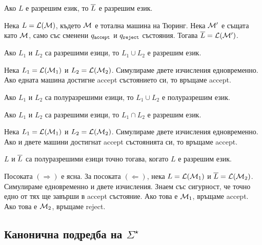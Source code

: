\begin{prop}
  Ако $L$ е разрешим език, то $\overline{L}$ е разрешим език.
\end{prop}
\begin{hint}
  Нека $L = \mathcal{L}(\mathcal{M})$, където $\mathcal{M}$ е тотална машина на Тюринг.
  Нека $\mathcal{M}'$ е същата като $\mathcal{M}$, само със сменени $q_{\texttt{accept}}$ и $q_{\texttt{reject}}$ състояния.
  Тогава $\overline{L} = \mathcal{L}(\mathcal{M}')$.
\end{hint}

\begin{prop}
  Ако $L_1$ и $L_2$ са разрешими езици, то $L_1 \cup L_2$ е разрешим език.
\end{prop}
\begin{hint}
  Нека $L_1 = \mathcal{L}(\mathcal{M}_1)$ и $L_2 = \mathcal{L}(\mathcal{M}_2)$.
  Симулираме двете изчисления едновременно.
  Ако едната машина достигне accept състоянието си, то връщаме accept.
\end{hint}

\begin{prop}
  Ако $L_1$ и $L_2$ са полуразрешими езици, то $L_1 \cup L_2$ е полуразрешим език.
\end{prop}

\begin{prop}
  Ако $L_1$ и $L_2$ са разрешими езици, то $L_1 \cap L_2$ е разрешим език.
\end{prop}
\begin{hint}
  Нека $L_1 = \mathcal{L}(\mathcal{M}_1)$ и $L_2 = \mathcal{L}(\mathcal{M}_2)$.
  Симулираме двете изчисления едновременно.
  Ако и двете машини достигнат accept състоянията си, то връщаме accept.
\end{hint}

\begin{framed}
  \begin{thm}
    $L$ и $\overline{L}$ са полуразрешими езици точно тогава, когато $L$ е разрешим език.
  \end{thm}
\end{framed}
\begin{hint}
  Посоката $(\Rightarrow)$ е ясна.
  За посоката $(\Leftarrow)$, нека $L = \mathcal{L}(\mathcal{M}_1)$ и $\overline{L} = \mathcal{L}(\mathcal{M}_2)$.
  Симулираме едновременно и двете изчисления.
  Знаем със сигурност, че точно едно от тях ще завърши в accept състояние.
  Ако това е $\mathcal{M}_1$, връщаме accept.
  Ако това е $\mathcal{M}_2$, връщаме reject.
\end{hint}

\subsection*{Канонична подредба на $\Sigma^\star$}

